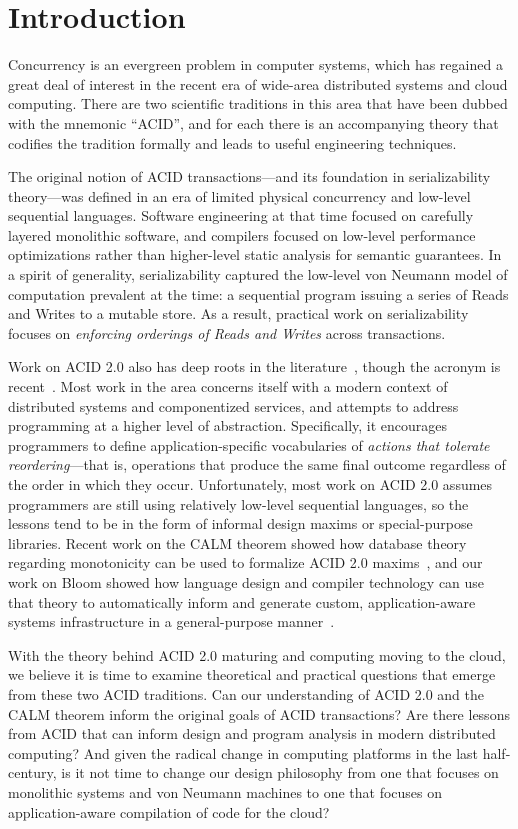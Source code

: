 \documentclass{sig-alternate}
\begin{document}
\section{Introduction}
Concurrency is an evergreen problem in computer systems, which has regained a
great deal of interest in the recent era of wide-area distributed systems and
cloud computing.  There are two scientific traditions in this area that have
been dubbed with the mnemonic ``ACID'', and for each there is an
accompanying theory that codifies the tradition formally and leads to useful
engineering techniques.

The original notion of ACID transactions---and its foundation in serializability theory---was defined in an era of limited physical concurrency and low-level sequential languages.  Software engineering at that time focused on carefully layered monolithic software, and compilers focused on low-level performance optimizations rather than higher-level static analysis for semantic guarantees.  In a spirit of generality, serializability captured the low-level von Neumann model of computation prevalent at the time: a sequential program issuing a series of Reads and Writes to a mutable store.  As a result, practical work on serializability focuses on \emph{enforcing orderings of Reads and Writes} across transactions.

Work on ACID 2.0 also has deep roots in the literature~\cite{Fischer1982}, though the acronym is recent~\cite{Helland2009}.  Most work in the area concerns itself with a modern context of distributed systems and componentized services, and attempts to address programming at a higher level of abstraction.  Specifically,  it encourages programmers to define application-specific vocabularies of \emph{actions that tolerate reordering}---that is, operations
that produce the same final outcome regardless of the order in which they occur.  
Unfortunately, most work on ACID 2.0 assumes programmers are still using relatively low-level sequential languages, so the lessons tend to be in the form of informal design maxims or special-purpose libraries.  Recent work on the CALM theorem showed how database theory regarding monotonicity can be used to formalize ACID 2.0 maxims~\cite{Alvaro2011,Ameloot2011,Conway2012,Hellerstein2010}, and our work on Bloom showed how language design and compiler technology can use that theory to automatically inform and generate custom, application-aware systems infrastructure in a general-purpose manner~\cite{Alvaro2011}.  

With the theory behind ACID 2.0 maturing and computing moving to the cloud, we believe it is time to examine theoretical and practical questions that emerge from these two ACID traditions. Can our understanding of ACID 2.0 and the CALM theorem inform the original goals of ACID transactions?  Are there lessons from ACID that can inform design and program analysis in modern distributed computing?  And given the radical change in computing platforms in the last half-century, is it not time to change our design philosophy from one that focuses on monolithic systems and von Neumann machines to one that focuses on application-aware compilation of code for the cloud?
\end{document}
